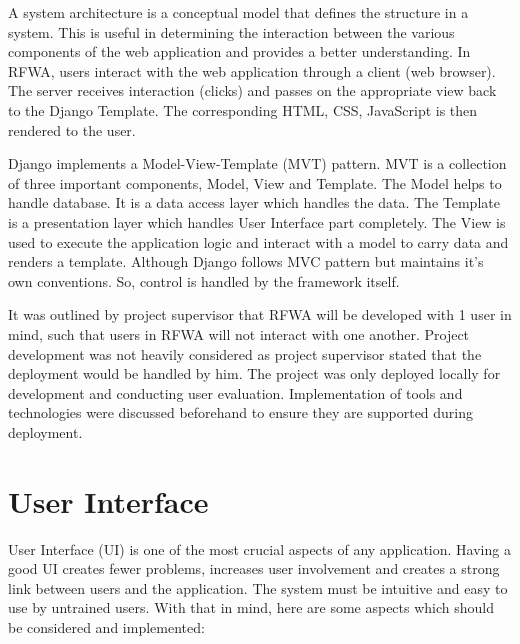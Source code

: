 \documentclass{l4proj}
\begin{document}
A system architecture is a conceptual model that defines the structure in a system. This is useful in determining the interaction between the various components of the web application and provides a better understanding. In RFWA, users interact with the web application through a client (web browser). The server receives interaction (clicks) and passes on the appropriate view back to the Django Template. The corresponding HTML, CSS, JavaScript is then rendered to the user. 

Django implements a Model-View-Template (MVT) pattern. MVT is a collection of three important components, Model, View and Template. The Model helps to handle database. It is a data access layer which handles the data. The Template is a presentation layer which handles User Interface part completely. The View is used to execute the application logic and interact with a model to carry data and renders a template. Although Django follows MVC pattern but maintains it's own conventions. So, control is handled by the framework itself.

It was outlined by project supervisor that RFWA will be developed with 1 user in mind, such that users in RFWA will not interact with one another. Project development was not heavily considered as project supervisor stated that the deployment would be handled by him. The project was only deployed locally for development and conducting user evaluation. Implementation of tools and technologies were discussed beforehand to ensure they are supported during deployment.

\section{User Interface}

User Interface (UI) is one of the most crucial aspects of any application. Having a good UI creates fewer problems, increases user involvement and creates a strong link between users and the application. The system must be intuitive and easy to use by untrained users. With that in mind, here are some aspects which should be considered and implemented:
\end{document}
